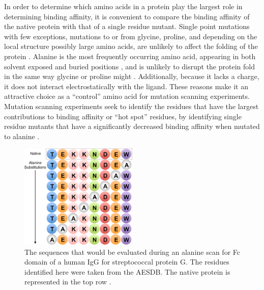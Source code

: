 In order to determine which amino acids in a protein play the largest role in determining binding affinity, it is convenient to compare the binding affinity of the native protein with that of a single residue mutant.
Single point mutations with few exceptions, mutations to or from glycine, proline, and depending on the local structure possibly large amino acids, are unlikely to affect the folding of the protein \cite{illergaard2009structure,betts2003amino}.
Alanine is the most frequently occurring amino acid, appearing in both solvent exposed and buried positions \cite{chothia1976nature,rose1985hydrophobicity}, and is unlikely to disrupt the protein fold in the same way glycine or proline might \cite{klapper1977independent,betts2003amino}.
Additionally, because it lacks a charge, it does not interact electrostatically with the ligand.
These reasons make it an attractive choice as a ``control'' amino acid for mutation scanning experiments.
Mutation scanning experiments seek to identify the residues that have the largest contributions to binding affinity or ``hot spot'' residues, by identifying single residue mutants that have a significantly decreased binding affinity when mutated to alanine \cite{cunningham1989high}.
\begin{figure}[h]
\centering
\includegraphics[width=0.5\textwidth]{figures/alanine_scan.png}
\caption{The sequences that would be evaluated during an alanine scan for Fc domain of a human IgG for streptococcal protein G.
The residues identified here were taken from the AESDB.
The native protein is represented in the top row \protect\cite{sauer1995crystal,thorn2001asedb}.}
\label{fig:alanine_scan}
\end{figure}

